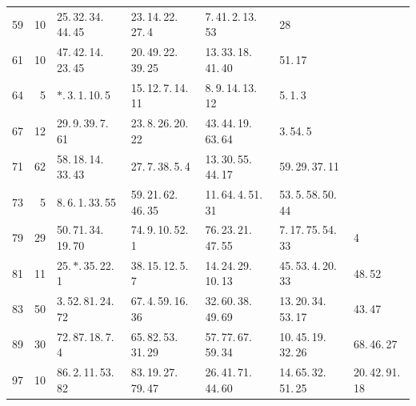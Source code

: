 \begin{landscape}
\begin{tabular}{r||r|lllll}
59 & 10 & 25.\,32.\,34.\,44.\,45 & 23.\,14.\,22.\,27.\,4 & 7.\,41.\,2.\,13.\,53 & 28 & \\
61 & 10 & 47.\,42.\,14.\,23.\,45 & 20.\,49.\,22.\,39.\,25 & 13.\,33.\,18.\,41.\,40 & 51.\,17 & \\
64 & 5 & \(\ast\).\,3.\,1.\,10.\,5 & 15.\,12.\,7.\,14.\,11 & 8.\,9.\,14.\,13.\,12 & 5.\,1.\,3 & \\
67 & 12 & 29.\,9.\,39.\,7.\,61 & 23.\,8.\,26.\,20.\,22 & 43.\,44.\,19.\,63.\,64 & 3.\,54.\,5 & \\
71 & 62 & 58.\,18.\,14.\,33.\,43 & 27.\,7.\,38.\,5.\,4 & 13.\,30.\,55.\,44.\,17 & 59.\,29.\,37.\,11 & \\
73 & 5 & 8.\,6.\,1.\,33.\,55 & 59.\,21.\,62.\,46.\,35 & 11.\,64.\,4.\,51.\,31 & 53.\,5.\,58.\,50.\,44 & \\
79 & 29 & 50.\,71.\,34.\,19.\,70 & 74.\,9.\,10.\,52.\,1 & 76.\,23.\,21.\,47.\,55 & 7.\,17.\,75.\,54.\,33 & 4\\
81 & 11 & 25.\,\(\ast\).\,35.\,22.\,1 & 38.\,15.\,12.\,5.\,7 & 14.\,24.\,29.\,10.\,13 & 45.\,53.\,4.\,20.\,33 & 48.\,52\\
83 & 50 & 3.\,52.\,81.\,24.\,72 & 67.\,4.\,59.\,16.\,36 & 32.\,60.\,38.\,49.\,69 & 13.\,20.\,34.\,53.\,17 & 43.\,47\\
89 & 30 & 72.\,87.\,18.\,7.\,4 & 65.\,82.\,53.\,31.\,29 & 57.\,77.\,67.\,59.\,34 & 10.\,45.\,19.\,32.\,26 & 68.\,46.\,27\\
97 & 10 & 86.\,2.\,11.\,53.\,82 & 83.\,19.\,27.\,79.\,47 & 26.\,41.\,71.\,44.\,60 & 14.\,65.\,32.\,51.\,25 & 20.\,42.\,91.\,18\\
\hline\end{tabular}\par\endgroup\end{landscape}
